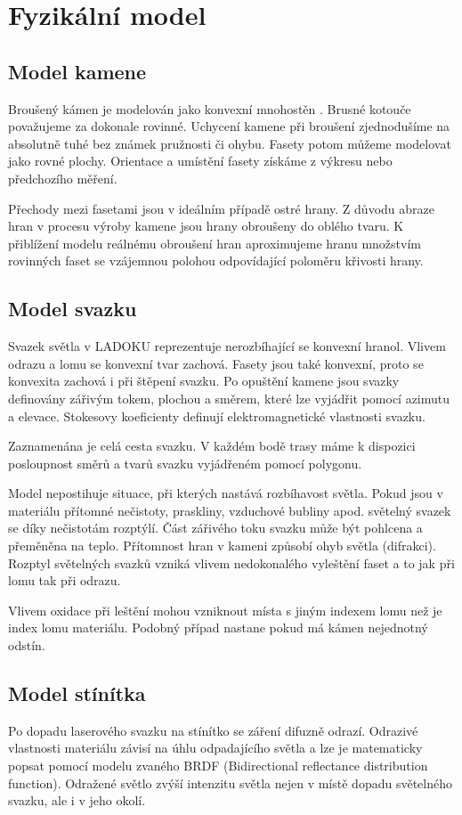 \chapter{Fyzikální model}

\section{Model kamene}
Broušený kámen je modelován jako konvexní mnohostěn \cite{Pohl2002}. Brusné kotouče považujeme za dokonale rovinné. Uchycení kamene při broušení zjednodušíme na absolutně tuhé bez známek pružnosti či ohybu. Fasety potom můžeme modelovat jako rovné plochy. Orientace a umístění fasety získáme z výkresu nebo předchozího měření. 

Přechody mezi fasetami jsou v ideálním případě ostré hrany. Z důvodu abraze hran v procesu výroby kamene jsou hrany obroušeny do oblého tvaru. K přiblížení modelu reálnému obroušení hran aproximujeme hranu množstvím rovinných faset se vzájemnou polohou odpovídající poloměru křivosti hrany.  
  

\section{Model svazku}
Svazek světla v LADOKU reprezentuje nerozbíhající se konvexní hranol. Vlivem odrazu a lomu se konvexní tvar zachová. Fasety jsou také konvexní, proto se konvexita zachová i při štěpení svazku. Po opuštění kamene jsou svazky definovány zářivým tokem, plochou a směrem, které lze vyjádřit pomocí azimutu a elevace. Stokesovy koeficienty definují elektromagnetické vlastnosti svazku. 

Zaznamenána je celá cesta svazku. V každém bodě trasy máme k dispozici posloupnost směrů a tvarů svazku vyjádřeném pomocí polygonu. 

Model nepostihuje situace, při kterých nastává rozbíhavost světla. Pokud jsou v materiálu přítomné nečistoty, praskliny, vzduchové bubliny apod. světelný svazek se díky nečistotám rozptýlí. Část zářivého toku svazku může být pohlcena a přeměněna na teplo. Přítomnost hran v kameni způsobí ohyb světla (difrakci). Rozptyl světelných svazků vzniká vlivem nedokonalého vyleštění faset a to jak při lomu tak při odrazu. 

Vlivem oxidace při leštění mohou vzniknout místa s jiným indexem lomu než je index lomu materiálu. Podobný případ nastane pokud má kámen nejednotný odstín. 



\section{Model stínítka}
\label{sec:stinitko}
Po dopadu laserového svazku na stínítko se záření difuzně odrazí. Odrazivé vlastnosti materiálu závisí na úhlu odpadajícího světla a lze je matematicky popsat pomocí modelu zvaného BRDF (Bidirectional reflectance distribution function). Odražené světlo zvýší intenzitu světla nejen v místě dopadu světelného svazku, ale i v jeho okolí.

